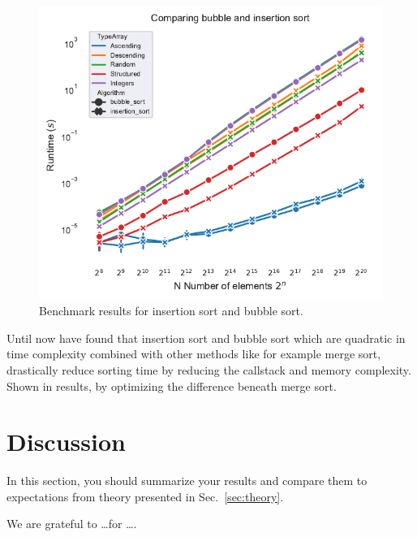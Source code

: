 \documentclass[sigconf, nonacm, natbib, screen, balance=False]{acmart}
\begin{document}
\begin{figure}
  \centering
  \includegraphics[scale=0.85]{runtimebubble&insertion.pdf}
  \caption{Benchmark results for insertion sort and bubble sort.}
  \label{fig:bubble_sort}
\end{figure}

Until now have found that insertion sort and bubble sort which are quadratic in time complexity combined with other methods like for example merge sort, drastically reduce sorting time by reducing the callstack and memory complexity. Shown in results, by optimizing the difference beneath merge sort.

\section{Discussion}\label{sec:discussion}

In this section, you should summarize your results and compare them to
expectations from theory presented in Sec.~\ref{sec:theory}.

\begin{acks}
We are grateful to \dots for \dots.
\end{acks}






\end{document}

